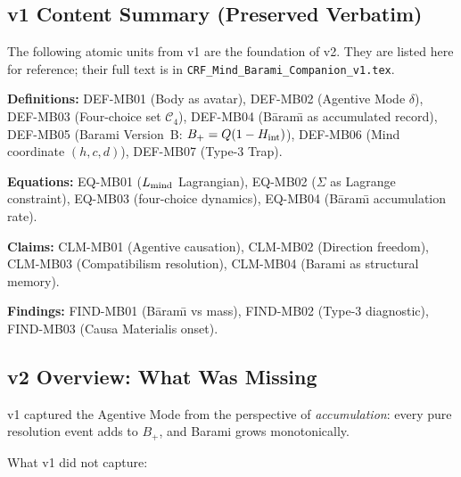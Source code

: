 \documentclass[12pt, a4paper]{article}
\providecommand{\Bplus}{B_{+}}
\begin{document}
\tableofcontents
\newpage

\subsection{v1 Content Summary (Preserved Verbatim)}


\begin{keybox}[title={v1 Atomic Registry (Preserved --- Do Not Alter)}]
The following atomic units from v1 are the foundation of v2.
They are listed here for reference; their full text is in
\texttt{CRF\_Mind\_Barami\_Companion\_v1.tex}.

\medskip
\textbf{Definitions:} DEF-MB01 (Body as avatar),
DEF-MB02 (Agentive Mode $\delta$),
DEF-MB03 (Four-choice set $\mathcal{C}_4$),
DEF-MB04 (B\={a}ram\={\i} as accumulated record),
DEF-MB05 (Barami Version~B: $\Bplus = Q(1-H_{\rm int})$),
DEF-MB06 (Mind coordinate $(h,c,d)$),
DEF-MB07 (Type-3 Trap).

\medskip
\textbf{Equations:} EQ-MB01 ($L_{\rm mind}$ Lagrangian),
EQ-MB02 ($\Sigma$ as Lagrange constraint),
EQ-MB03 (four-choice dynamics),
EQ-MB04 (B\={a}ram\={\i} accumulation rate).

\medskip
\textbf{Claims:} CLM-MB01 (Agentive causation),
CLM-MB02 (Direction freedom),
CLM-MB03 (Compatibilism resolution),
CLM-MB04 (Barami as structural memory).

\medskip
\textbf{Findings:} FIND-MB01 (B\={a}ram\={\i} vs mass),
FIND-MB02 (Type-3 diagnostic),
FIND-MB03 (Causa Materialis onset).
\end{keybox}

\subsection{v2 Overview: What Was Missing}


v1 captured the Agentive Mode from the perspective of
\emph{accumulation}: every pure resolution event adds to
$\Bplus$, and Barami grows monotonically.

What v1 did not capture:
\end{document}
